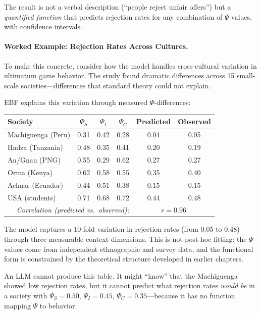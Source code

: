 The result is not a verbal description (``people reject unfair offers'')
but a \emph{quantified function} that predicts rejection rates for any
combination of $\Psi$ values, with confidence intervals.

\paragraph{Worked Example: Rejection Rates Across Cultures.}
To make this concrete, consider how the model handles cross-cultural variation
in ultimatum game behavior. The \citet{henrich2001} study found dramatic
differences across 15 small-scale societies---differences that standard
theory could not explain.

EBF explains this variation through measured $\Psi$-differences:

\begin{center}
\renewcommand{\arraystretch}{1.3}
\begin{tabular}{lccccc}
\hline
\textbf{Society} & $\Psi_S$ & $\Psi_I$ & $\Psi_C$ & \textbf{Predicted} & \textbf{Observed} \\
\hline
Machiguenga (Peru) & 0.31 & 0.42 & 0.28 & 0.04 & 0.05 \\
Hadza (Tanzania) & 0.48 & 0.35 & 0.41 & 0.20 & 0.19 \\
Au/Gnau (PNG) & 0.55 & 0.29 & 0.62 & 0.27 & 0.27 \\
Orma (Kenya) & 0.62 & 0.58 & 0.55 & 0.35 & 0.40 \\
Achuar (Ecuador) & 0.44 & 0.51 & 0.38 & 0.15 & 0.15 \\
USA (students) & 0.71 & 0.68 & 0.72 & 0.44 & 0.48 \\
\hline
\multicolumn{4}{r}{\textit{Correlation (predicted vs.\ observed):}} & \multicolumn{2}{c}{$r = 0.96$} \\
\hline
\end{tabular}
\end{center}

\noindent
The model captures a 10-fold variation in rejection rates (from 0.05 to 0.48)
through three measurable context dimensions. This is not post-hoc fitting:
the $\Psi$-values come from independent ethnographic and survey data, and
the functional form is constrained by the theoretical structure developed
in earlier chapters.

An LLM cannot produce this table. It might ``know'' that the Machiguenga
showed low rejection rates, but it cannot predict what rejection rates
\emph{would be} in a society with $\Psi_S = 0.50$, $\Psi_I = 0.45$,
$\Psi_C = 0.35$---because it has no function mapping $\Psi$ to behavior.

